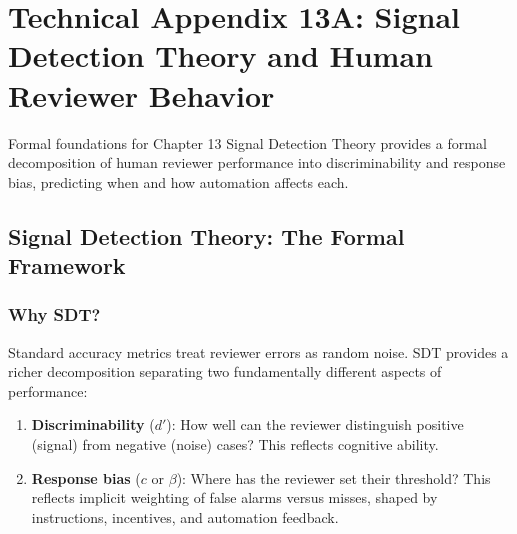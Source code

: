 
\chapter*{Technical Appendix 13A: Signal Detection Theory and Human Reviewer Behavior}

\begin{chapterquote}{Formal foundations for Chapter 13}
Signal Detection Theory provides a formal decomposition of human reviewer performance into discriminability and response bias, predicting when and how automation affects each.
\end{chapterquote}

\apxnumon
\section{Signal Detection Theory: The Formal Framework}

\subsection{Why SDT?}

Standard accuracy metrics treat reviewer errors as random noise. SDT provides a richer decomposition separating two fundamentally different aspects of performance:

\begin{enumerate}
    \item \textbf{Discriminability} ($d'$): How well can the reviewer distinguish positive (signal) from negative (noise) cases? This reflects cognitive ability.
    \item \textbf{Response bias} ($c$ or $\beta$): Where has the reviewer set their threshold? This reflects implicit weighting of false alarms versus misses, shaped by instructions, incentives, and automation feedback.
\end{enumerate}

